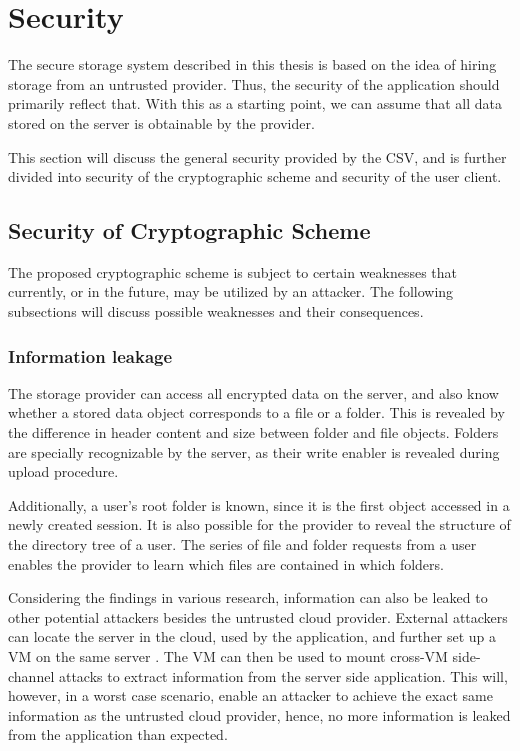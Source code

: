 \documentclass[pdftex,english,10pt,b5paper,twoside]{book}
\begin{document}
\section{Security}

The secure storage system described in this thesis is based on the idea of
hiring storage from an untrusted provider. Thus, the security of the
application should primarily reflect that. With this as a starting point, we
can assume that all data stored on the server is obtainable by the provider.

This section will discuss the general security provided by the \acl{CSV}, and
is further divided into security of the cryptographic scheme and security of
the user client.

\subsection{Security of Cryptographic Scheme}

The proposed cryptographic scheme is subject to certain weaknesses that
currently, or in the future, may be utilized by an attacker. The following
subsections will discuss possible weaknesses and their consequences.

\subsubsection{Information leakage}

The storage provider can access all encrypted data on the server, and also know
whether a stored data object corresponds to a file or a folder. This is
revealed by the difference in header content and size between folder and file
objects. Folders are specially recognizable by the server, as their write
enabler is revealed during upload procedure. 

Additionally, a user's root folder is known, since it is the first object
accessed in a newly created session. It is also possible for the provider to
reveal the structure of the directory tree of a user. The series of file and
folder requests from a user enables the provider to learn which files are
contained in which folders.

Considering the findings in various research, information can also be leaked to
other potential attackers besides the untrusted cloud provider. External
attackers can locate the server in the cloud, used by the application, and
further set up a \ac{VM} on the same server \cite{cloud_getoff}. The \ac{VM}
can then be used to mount cross-\ac{VM} side-channel attacks to extract
information from the server side application. This will, however, in a worst
case scenario, enable an attacker to achieve the exact same information as the
untrusted cloud provider, hence, no more information is leaked from the
application than expected.
\end{document}
